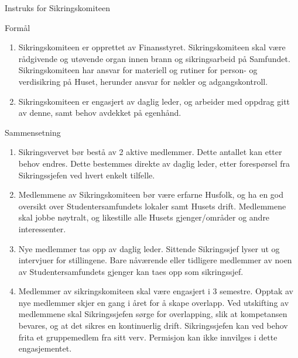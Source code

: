 \begin{instruks*}{Instruks for Sikringskomiteen}
    \begin{instruksledd}{Formål}
        \begin{enumerate}
            \item  Sikringskomiteen er opprettet av Finansstyret. Sikringskomiteen skal
                være rådgivende og utøvende organ
                innen brann og sikringsarbeid på Samfundet. Sikringskomiteen har ansvar
                for materiell og rutiner for person-
                og verdisikring på Huset, herunder ansvar for nøkler og adgangskontroll.
            \item Sikringskomiteen er engasjert av daglig leder, og arbeider med oppdrag
                gitt av denne, samt behov avdekket
                på egenhånd.
        \end{enumerate}
    \end{instruksledd}

    \begin{instruksledd}{Sammensetning}
        \begin{enumerate}
            \item Sikringsvervet bør bestå av 2 aktive medlemmer. Dette antallet kan etter behov
                endres. Dette bestemmes
                direkte av daglig leder, etter forespørsel fra Sikringssjefen ved hvert enkelt
                tilfelle.
            \item Medlemmene av Sikringskomiteen bør være erfarne Husfolk, og ha en god oversikt over
                Studentersamfundets lokaler samt Husets drift. Medlemmene skal jobbe nøytralt, og
                likestille alle Husets
                gjenger/områder og andre interessenter.
            \item Nye medlemmer tas opp av daglig leder. Sittende Sikringssjef lyser ut og intervjuer
                for stillingene. Bare
                nåværende eller tidligere medlemmer av noen av Studentersamfundets gjenger kan taes
                opp som sikringssjef.
            \item Medlemmer av sikringskomiteen skal være engasjert i 3 semestre. Opptak av nye
                medlemmer skjer en gang i
                året for å skape overlapp. Ved utskifting av medlemmene skal Sikringssjefen sørge for
                overlapping, slik at
                kompetansen bevares, og at det sikres en kontinuerlig drift. Sikringssjefen kan ved
                behov frita et
                gruppemedlem fra sitt verv. Permisjon kan ikke innvilges i dette engasjementet.
        \end{enumerate}
    \end{instruksledd}


\end{instruks*}
